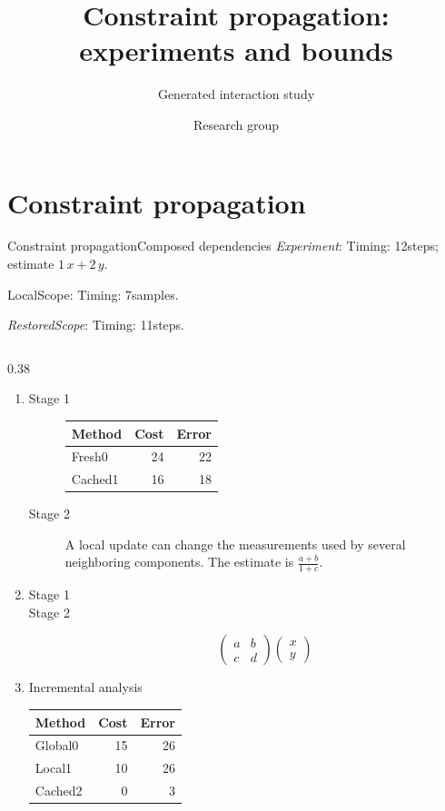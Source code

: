 \documentclass[11pt,aspectratio=43]{beamer}
\title{Constraint propagation: experiments and bounds}
\subtitle{Generated interaction study}
\author{Research group}
\date{}
\newcommand{\fuzzlayerA}[1]{\textit{#1}}
\newcommand{\fuzzterm}[1]{\fuzzlayerA{#1}}
\newcommand{\fuzzpair}[2]{\fuzzterm{#1}: #2}
\newcommand{\fuzzunit}{steps}
\newcommand{\fuzzcoefficient}{1}
\newcommand{\fuzzscale}[2][\fuzzcoefficient]{#1\,#2}
\begin{document}
\section{Constraint propagation}
\begin{frame}[t,shrink=5]{Constraint propagation}{Composed dependencies}
\fuzzpair{Experiment}{Timing: 12\fuzzunit; estimate $\fuzzscale{x}+\fuzzscale[2]{y}$.}\par
{\renewcommand{\fuzzunit}{samples}\let\fuzzterm\textrm\fuzzpair{LocalScope}{Timing: 7\fuzzunit.}\par}
\fuzzpair{RestoredScope}{Timing: 11\fuzzunit.}\par
\begin{columns}[onlytextwidth,c]
\begin{column}{0.38\textwidth}
\begin{enumerate}
\item<1-> \begin{description}
\item[Stage 1] \begin{tabular}{lrr}Method&Cost&Error\\\hline
Fresh0&24&22\\
Cached1&16&18\\
\end{tabular}
\item[Stage 2] \textrm{A local update} can change the measurements used by several neighboring components.  The estimate is $\frac{a+b}{1+c}$.
\end{description}
\item<2-> \begin{description}
\item[Stage 1] 
\item[Stage 2] \[\begin{pmatrix}a&b\\c&d\end{pmatrix}\begin{pmatrix}x\\y\end{pmatrix}\]
\end{description}
\item<3-> \begin{exampleblock}{Incremental analysis}
\begin{tabular}{lrr}Method&Cost&Error\\\hline
Global0&15&26\\
Local1&10&26\\
Cached2&0&3\\

\end{tabular}
\end{exampleblock}
\end{enumerate}
\end{column}
\end{columns}
\end{frame}
\end{document}
